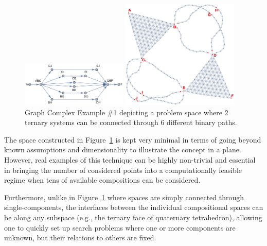 \begin{figure}[H]
    \centering
    \begin{adjustbox}{valign=c}
        \includegraphics[width=0.45\textwidth]{nimplex/GraphComplexMap1.png}
    \end{adjustbox}
    \hspace{6pt}
    \begin{adjustbox}{valign=c}
        \includegraphics[width=0.5\textwidth]{nimplex/GraphComplex1Trim.jpeg}
    \end{adjustbox}
    \caption{Graph Complex Example \#1 depicting a problem space where 2 ternary systems can be connected through 6 different binary paths.} 
    \label{nimplex:fig:graphcomplex1}
\end{figure}

The space constructed in Figure~\ref{nimplex:fig:graphcomplex1} is kept very minimal in terms of going beyond known assumptions and dimensionality to illustrate the concept in a plane. However, real examples of this technique can be highly non-trivial and essential in bringing the number of considered points into a computationally feasible regime when tens of available compositions can be considered. 

Furthermore, unlike in Figure~\ref{nimplex:fig:graphcomplex1} where spaces are simply connected through single-components, the interfaces between the individual compositional spaces can be along any subspace (e.g., the ternary face of quaternary tetrahedron), allowing one to quickly set up search problems where one or more components are unknown, but their relations to others are fixed. 

